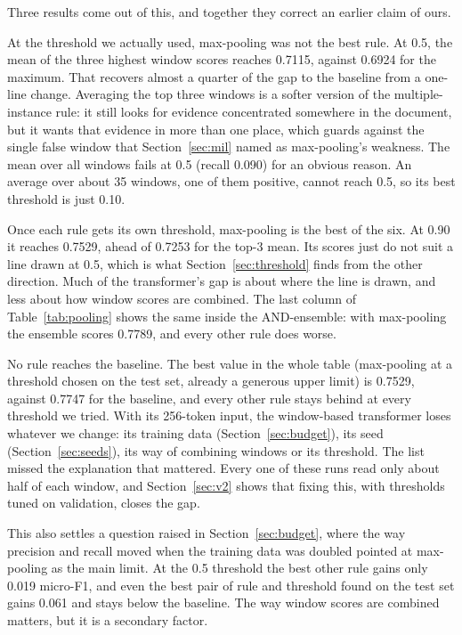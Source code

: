 Three results come out of this, and together they correct an earlier claim of ours.

At the threshold we actually used, max-pooling was not the best rule. At 0.5, the mean of the three highest window scores reaches 0.7115, against 0.6924 for the maximum. That recovers almost a quarter of the gap to the baseline from a one-line change. Averaging the top three windows is a softer version of the multiple-instance rule: it still looks for evidence concentrated somewhere in the document, but it wants that evidence in more than one place, which guards against the single false window that Section~\ref{sec:mil} named as max-pooling's weakness. The mean over all windows fails at 0.5 (recall 0.090) for an obvious reason. An average over about 35 windows, one of them positive, cannot reach 0.5, so its best threshold is just 0.10.

Once each rule gets its own threshold, max-pooling is the best of the six. At 0.90 it reaches 0.7529, ahead of 0.7253 for the top-3 mean. Its scores just do not suit a line drawn at 0.5, which is what Section~\ref{sec:threshold} finds from the other direction. Much of the transformer's gap is about where the line is drawn, and less about how window scores are combined. The last column of Table~\ref{tab:pooling} shows the same inside the AND-ensemble: with max-pooling the ensemble scores 0.7789, and every other rule does worse.

No rule reaches the baseline. The best value in the whole table (max-pooling at a threshold chosen on the test set, already a generous upper limit) is 0.7529, against 0.7747 for the baseline, and every other rule stays behind at every threshold we tried. With its 256-token input, the window-based transformer loses whatever we change: its training data (Section~\ref{sec:budget}), its seed (Section~\ref{sec:seeds}), its way of combining windows or its threshold. The list missed the explanation that mattered. Every one of these runs read only about half of each window, and Section~\ref{sec:v2} shows that fixing this, with thresholds tuned on validation, closes the gap.

This also settles a question raised in Section~\ref{sec:budget}, where the way precision and recall moved when the training data was doubled pointed at max-pooling as the main limit. At the 0.5 threshold the best other rule gains only 0.019 micro-F1, and even the best pair of rule and threshold found on the test set gains 0.061 and stays below the baseline. The way window scores are combined matters, but it is a secondary factor.

